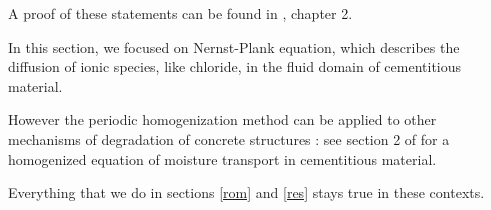 \ligneinter
A proof of these statements can be found in \cite{th_khaledB}, chapter 2.

\begin{rema}%
In this section, we focused on Nernst-Plank equation, which describes the diffusion of ionic species, like chloride, in the fluid domain of cementitious material.

\par
However the periodic homogenization method can be applied to other mechanisms of degradation of concrete structures : %
see section 2 of \cite{WalMill16} for a homogenized equation of moisture transport in cementitious material.

\par
Everything that we do in sections \ref{rom} and \ref{res} stays true in these contexts.
\end{rema}
\begin{comment}
\subsubsection{Homogenized Richards Equation \cite{WalMill16}}

\begin{equation}\label{ric_wat}
\dfrac{\partial{\theta_l}}{\partial{t}}-div_x\left(\mathbf{D^{hom}_{\theta}}\dfrac{\partial{\theta_l}}{\partial{x}}\right)=0
\end{equation}

where $\theta_l$ is the water content : $\theta_l=\dfrac{\Omega_l}{\Omega}$ ; and

\[\mathbf{D^{hom}_{\theta}}=-\Lambda_{ll}\dfrac{\partial{P_c}}{\partial{\theta_l}}+\dfrac{1}{\rho_l}\mathbf{D^{hom}_{v}}\dfrac{\partial{\rho_v}}{\partial{\theta_l}}\]

denotes the homogenized diffusion tensor of moisture, $\rho_l$ and $\rho_v$ are liquid and vapour densities, respectively. $\Lambda_{ll}$ is the Darcy tensor of permeability, %
$P_c$ the macroscopic capillary pressure and $\mathbf{D^{hom}_{v}}$ the homogenized tensor of water vapour given by

\[\mathbf{D^{hom}_{v}}=\dfrac{1}{|\Omega|}\int\limits_{\Omega_{g}}D_v \left(I+\frac{\partial{\chi}}{\partial{y}}^{T}\right)\text{d}\Omega\]

where $D_v$ is the self-diffusion coefficient of water-vapour.

\par
The vector $\chi (y)$ is solution of the same system as for Nernst-Planck-Poisson equation, if we write $\Omega_g$ and $\Gamma_{gs}$ in place of $\Omega_f$ and $\Gamma_{sf}$.
\end{comment}

